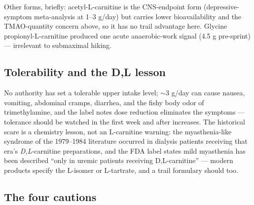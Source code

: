 Other forms, briefly: acetyl-L-carnitine is the CNS-endpoint form (depressive-symptom meta-analysis at 1--3 g/day) but carries lower bioavailability and the TMAO-quantity concern above, so it has no trail advantage here. Glycine propionyl-L-carnitine produced one acute anaerobic-work signal (4.5 g pre-sprint) --- irrelevant to submaximal hiking.

\subsection{Tolerability and the D,L lesson}

No authority has set a tolerable upper intake level; $\sim$3 g/day can cause nausea, vomiting, abdominal cramps, diarrhea, and the fishy body odor of trimethylamine, and the label notes dose reduction eliminates the symptoms --- tolerance should be watched in the first week and after increases. The historical scare is a chemistry lesson, not an L-carnitine warning: the myasthenia-like syndrome of the 1979--1984 literature occurred in dialysis patients receiving that era's \emph{D,L}-carnitine preparations, and the FDA label states mild myasthenia has been described ``only in uremic patients receiving D,L-carnitine'' --- modern products specify the L-isomer or L-tartrate, and a trail formulary should too.

\subsection{The four cautions}

